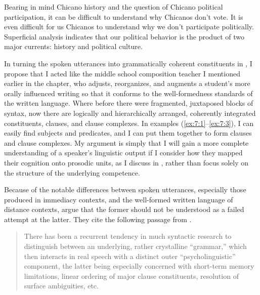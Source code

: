 \ex  Bearing in mind Chicano history and the question of Chicano political participation, it can be difficult to understand why Chicanos don’t vote. It is even difficult for us Chicanos to understand why we don’t participate politically. Superficial analysis indicates that our political behavior is the product of two major currents: history and political culture.
    \z
    \z

\noindent In turning the spoken utterances into grammatically coherent constituents in , I propose that I acted like the middle school composition teacher I mentioned earlier in the chapter, who adjusts, reorganizes, and augments a student’s more orally influenced writing so that it conforms to the well-formedness standards of the written language. Where before there were fragmented, juxtaposed blocks of syntax, now there are logically and hierarchically arranged, coherently integrated constituents, clauses, and clause complexes. In examples (\ref{ex:7:1}--\ref{ex:7:3}), I can easily find subjects and predicates, and I can put them together to form clauses and clause complexes. My argument is simply that I will gain a more complete understanding of a speaker's linguistic output if I consider how they mapped their cognition onto prosodic units, as I discuss in , rather than focus solely on the structure of the underlying competence.

Because of the notable differences between spoken utterances, especially those produced in immediacy contexts, and the well-formed written language of distance contexts,  \citet[26--27]{MillerWeinert1998} argue that the former should not be understood as a failed attempt at the latter. They cite the following passage from \citet[108]{Heath1985}.

\begin{quote}
  There has been a recurrent tendency in much syntactic research to distinguish between an underlying, rather crystalline “grammar,” which then interacts in real speech with a distinct outer “psycholinguistic” component, the latter being especially concerned with short-term memory limitations, linear ordering of major clause constituents, resolution of surface ambiguities, etc.
\end{quote}

